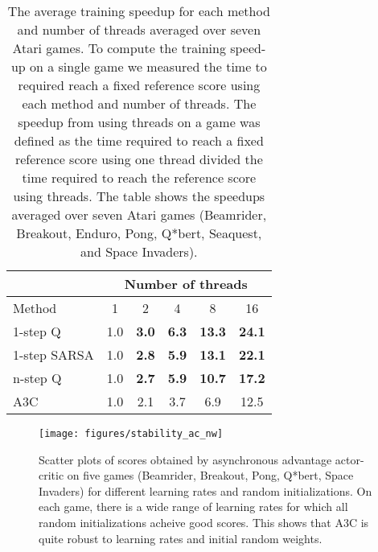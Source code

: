 \documentclass{article} \usepackage{times}
\begin{document}
\begin{table}[t]
\small
\begin{center}
\begin{tabular}{ | l | c | c | c | c | c | }
\hline
& \multicolumn{5}{|c|}{Number of threads} \\ \hline
Method & 1 & 2 & 4 & 8 & 16 \\
\hline
1-step Q & 1.0 & \textbf{3.0} & \textbf{6.3} & \textbf{13.3} & \textbf{24.1} \\ \hline
1-step SARSA & 1.0 & \textbf{2.8} & \textbf{5.9} & \textbf{13.1} & \textbf{22.1} \\ \hline
n-step Q & 1.0 & \textbf{2.7} & \textbf{5.9} & \textbf{10.7} & \textbf{17.2} \\ \hline
A3C & 1.0 & 2.1 & 3.7 & 6.9 & 12.5 \\ \hline
\end{tabular}
\caption{\label{fig-scalability} The average training speedup for each method and number of threads averaged over seven Atari games.
To compute the training speed-up on a single game we measured the time to required reach a fixed reference score using each method and number of threads.
The speedup from using  threads on a game was defined as the time required to reach a fixed reference score using one thread divided the time required to reach the reference score using  threads.
The table shows the speedups averaged over seven Atari games (Beamrider, Breakout, Enduro, Pong, Q*bert, Seaquest, and Space Invaders).
}
\end{center}
\vspace{-0.45cm}
\end{table}

\begin{figure*}[ht]
\centerline{\texttt{[image: figures/stability\_ac\_nw]}}
\vspace{-0.25cm}
\caption{\label{fig-stability-ac} Scatter plots of scores obtained by asynchronous advantage actor-critic on five games (Beamrider, Breakout, Pong, Q*bert, Space Invaders) for  different learning rates and random initializations. On each game, there is a wide range of learning rates for which all random initializations acheive good scores.  This shows that A3C is quite robust to learning rates and initial random weights.}
\vspace{-0.45cm}
\end{figure*}
\end{document}
